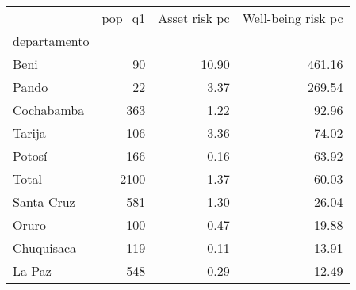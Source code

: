 \begin{tabular}{lrrr}
\toprule
{} &  pop\_q1 &  Asset risk pc &  Well-being risk pc \\
departamento &         &                &                     \\
\midrule
Beni         &      90 &          10.90 &              461.16 \\
Pando        &      22 &           3.37 &              269.54 \\
Cochabamba   &     363 &           1.22 &               92.96 \\
Tarija       &     106 &           3.36 &               74.02 \\
Potosí       &     166 &           0.16 &               63.92 \\
Total        &    2100 &           1.37 &               60.03 \\
Santa Cruz   &     581 &           1.30 &               26.04 \\
Oruro        &     100 &           0.47 &               19.88 \\
Chuquisaca   &     119 &           0.11 &               13.91 \\
La Paz       &     548 &           0.29 &               12.49 \\
\bottomrule
\end{tabular}
